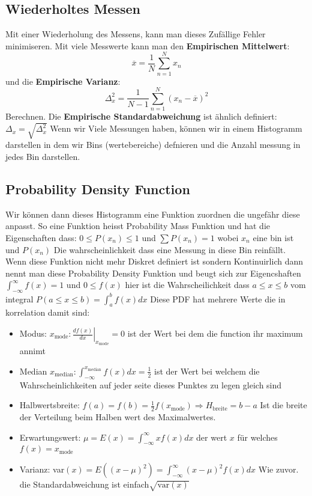 \documentclass{article}
\begin{document}
\hypertarget{PDF}{\subsection*{Wiederholtes Messen}}
Mit einer Wiederholung des Messens, kann man dieses Zufällige Fehler minimiseren. Mit viele Messwerte kann man den \textbf{Empirischen Mittelwert}:
\[\overline{x}=\frac{1}{N}\sum_{n=1}^N x_n\] und die \textbf{Empirische Varianz}:\[\Delta_x^2=\frac{1}{N-1}\sum_{n=1}^N(x_n-\overline{x})^2\]Berechnen. Die \textbf{Empirische Standardabweichung} ist ähnlich definiert: $\Delta_x=\sqrt{\Delta_x^2}$
\newline Wenn wir Viele Messungen haben, können wir in einem Histogramm darstellen in dem wir Bins (wertebereiche) defnieren und die Anzahl messung in jedes Bin darstellen.
\subsection*{Probability Density Function}
Wir können dann dieses Histogramm eine Funktion zuordnen die ungefähr diese anpasst. So eine Funktion heisst Probability Mass Funktion und hat die Eigenschaften dass: $0\le P(x_n)\le 1$ und $\sum P(x_n)=1$ wobei $x_n$ eine bin ist und $P(x_n)$ Die wahrscheinlichkeit dass eine Messung in diese Bin reinfällt.
Wenn diese Funktion nicht mehr Diskret definiert ist sondern Kontinuirlich dann nennt man diese Probability Density Funktion und beugt sich zur Eigencshaften $\int_{-\infty}^\infty f(x)=1$ und $0\le f(x)$ hier ist die Wahrscheilichkeit dass $a\le x\le b$ vom integral $P(a\le x\le b)=\int_a^b f(x) dx$
Diese PDF hat mehrere Werte die in korrelation damit sind:
\begin{itemize}
  \item{Modus: $x_\text{mode}:\left.\frac{df(x)}{dx}\right|_{x_\text{mode}}=0$  ist der Wert bei dem die function ihr maximum annimt}
  \item{Median $x_\text{median}:\int_{-\infty}^{x_\text{median}}f(x)dx=\frac{1}{2}$ ist der Wert bei welchem die Wahrscheinlichkeiten auf jeder seite dieses Punktes zu legen gleich sind}
  \item{Halbwertsbreite: $f(a)=f(b)=\frac{1}{2}f(x_\text{mode})\Longrightarrow H_\text{breite}=b-a$ Ist die breite der Verteilung beim Halben wert des Maximalwertes.}
  \item{Erwartungswert: $\mu=E(x)=\int_{-\infty}^\infty xf(x)dx$ der wert $x$ für welches $f(x)=x_\text{mode}$}
  \item{Varianz: var$(x)=E((x-\mu)^2)=\int_{-\infty}^\infty(x-\mu)^2f(x)dx$ Wie zuvor. die Standardabweichung ist einfach$\sqrt{\text{var}(x)}$}
\end{itemize}
\end{document}
